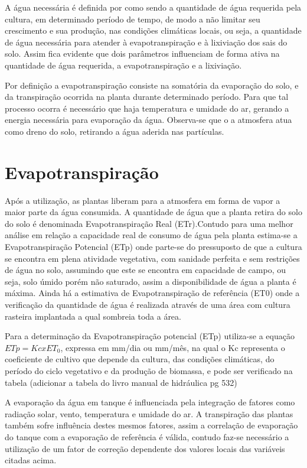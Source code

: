 A água necessária é definida por \cite{bernardo2006} como sendo a quantidade de água requerida pela cultura, em determinado período de tempo, de modo a não limitar seu crescimento e sua produção, nas condições climáticas locais, ou seja, a quantidade de água necessária para atender à evapotranspiração e à lixiviação dos sais do solo. Assim fica evidente que dois parâmetros influenciam de forma ativa na quantidade de água requerida, a evapotranspiração e a lixiviação.

Por definição a evapotranspiração consiste na somatória da evaporação do solo, e da transpiração ocorrida na planta durante determinado período. Para que tal processo ocorra é necessário que haja temperatura e umidade do ar, gerando a energia necessária para evaporação da água. Observa-se que o a atmosfera atua como dreno do solo, retirando a água aderida nas partículas.

\section{Evapotranspiração}

Após a utilização, as plantas liberam para a atmosfera em forma de vapor a maior parte da água consumida. A quantidade de água que a planta retira do solo do solo é denominada Evapotranspiração Real (ETr).Contudo para uma melhor análise em relação a capacidade real de consumo de água pela planta estima-se a Evapotranspiração Potencial (ETp) onde parte-se do pressuposto de que a cultura se encontra em plena atividade vegetativa, com sanidade perfeita e sem restrições de água no solo, assumindo que este se encontra em capacidade de campo, ou seja, solo úmido porém não saturado, assim a disponibilidade de água a planta é máxima. Ainda há a estimativa de Evapotranspiração de referência (ET0) onde a verificação da quantidade de água é realizada através de uma área com cultura rasteira implantada a qual sombreia toda a área.

Para a determinação da Evapotranspiração potencial (ETp) utiliza-se a equação $ETp=Kc x ET_{0}$, expressa em mm/dia ou mm/mês, na qual o Kc representa o coeficiente de cultivo que depende da cultura, das condições climáticas, do período do ciclo vegetativo e da produção de biomassa, e pode ser verificado na tabela (adicionar a tabela do livro manual de hidráulica pg 532) 

A evaporação da água em tanque é influenciada pela integração de fatores como radiação solar, vento, temperatura e umidade do ar. A transpiração das plantas também sofre influência destes mesmos fatores, assim a correlação de evaporação do tanque com a evaporação de referência é válida, contudo faz-se necessário a utilização de um fator de correção dependente dos valores locais das variáveis citadas acima.

